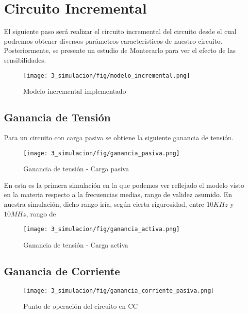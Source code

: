 \section{Circuito Incremental}
El siguiente paso será realizar el circuito incremental del circuito desde el cual podremos obtener diversos parámetros 
característicos de nuestro circuito. Posteriormente, se presente un estudio de Montecarlo para ver el efecto de 
las sensibilidades.

\begin{figure}[H]
    \centering
    \texttt{[image: 3\_simulacion/fig/modelo\_incremental.png]}
    \label{mediciones_pol_activa}
    \caption{Modelo incremental implementado}
\end{figure}

\subsection{Ganancia de Tensión}

Para un circuito con carga pasiva se obtiene la siguiente ganancia de tensión.

\begin{figure}[H]
    \centering
    \texttt{[image: 3\_simulacion/fig/ganancia\_pasiva.png]}
    \label{mediciones_pol_activa}
    \caption{Ganancia de tensión -  Carga pasiva}
\end{figure}

En esta es la primera simulación en la que podemos ver reflejado el modelo visto en 
la materia respecto a la frecuencias medias, rango de validez asumido. En nuestra simulación,
dicho rango iría, según cierta rigurosidad, entre $10 KHz$ y $10 MHz$, rango de 

\begin{figure}[H]
    \centering
    \texttt{[image: 3\_simulacion/fig/ganancia\_activa.png]}
    \label{fig:ganancia lineal func frecuencia activa simulada}
    \caption{Ganancia de tensión -  Carga activa}
\end{figure}

\subsection{Ganancia de Corriente}

\begin{figure}[H]
    \centering
    \texttt{[image: 3\_simulacion/fig/ganancia\_corriente\_pasiva.png]}
    \label{mediciones_pol_activa}
    \caption{Punto de operación del circuito en CC}
\end{figure}



